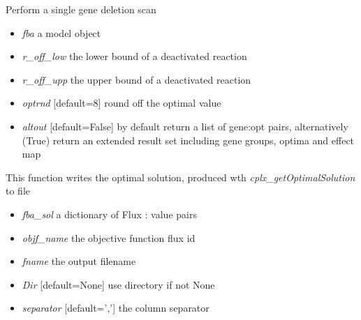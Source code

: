 \documentclass[a4paper,11pt,english]{sphinxmanual}
\begin{document}
\begin{fulllineitems}
\label{modules_doc:cbmpy.CBCPLEX.cplx_singleGeneScan}
Perform a single gene deletion scan
\begin{itemize}
\item {} 
\emph{fba} a model object

\item {} 
\emph{r\_off\_low} the lower bound of a deactivated reaction

\item {} 
\emph{r\_off\_upp} the upper bound of a deactivated reaction

\item {} 
\emph{optrnd} {[}default=8{]} round off the optimal value

\item {} 
\emph{altout} {[}default=False{]} by default return a list of gene:opt pairs, alternatively (True) return an extended result set including gene groups, optima and effect map

\end{itemize}

\end{fulllineitems}


\begin{fulllineitems}
\label{modules_doc:cbmpy.CBCPLEX.cplx_writeLPsolution}
This function writes the optimal solution, produced wth \emph{cplx\_getOptimalSolution} to file
\begin{itemize}
\item {} 
\emph{fba\_sol} a dictionary of Flux : value pairs

\item {} 
\emph{objf\_name} the objective function flux id

\item {} 
\emph{fname} the output filename

\item {} 
\emph{Dir} {[}default=None{]} use directory if not None

\item {} 
\emph{separator} {[}default=','{]} the column separator

\end{itemize}

\end{fulllineitems}
\end{document}
